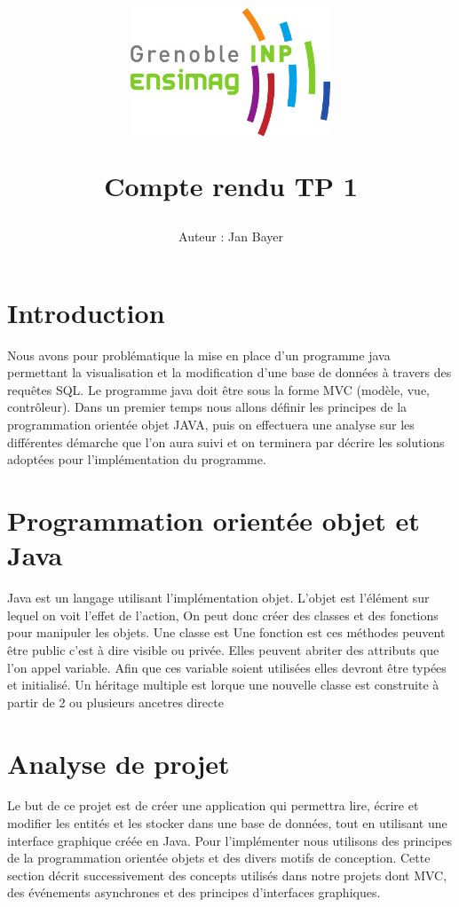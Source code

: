 \documentclass[10pt]{article}
\title{\begin{center}
\includegraphics[width=6cm]{ENSIMAG-eps-converted-to.pdf}
\end{center} \vspace{1cm} Compte rendu TP 1}
\author{Auteur : Jan Bayer }
\begin{document}
\maketitle
\newpage
\section{Introduction}
Nous avons pour problématique la mise en place d’un programme java permettant la visualisation et la modification d’une base de données à travers des requêtes SQL.
Le programme java doit être sous la forme MVC (modèle, vue, contrôleur).
Dans un premier temps nous allons définir les principes de la programmation orientée objet JAVA, puis on effectuera une analyse sur les différentes démarche que l’on aura suivi et on terminera par décrire les solutions adoptées pour l’implémentation du programme.
\section{Programmation orientée objet et Java}
Java est un langage utilisant l’implémentation objet. L’objet est l’élément sur lequel on voit l’effet de l’action, On peut donc créer des classes et des fonctions pour manipuler les objets.
Une classe est
Une fonction est
ces méthodes peuvent être public c’est à dire visible ou privée.
Elles peuvent abriter des attributs que l’on appel variable. Afin que ces variable soient utilisées elles devront être typées et initialisé.
Un héritage multiple est lorque une nouvelle classe est construite à partir de 2 ou plusieurs ancetres directe

\section{Analyse de projet}
Le but de ce projet est de créer une application qui permettra lire, écrire et modifier les entités et les stocker dans une base de données, tout en utilisant une interface graphique créée en Java. Pour l’implémenter nous utilisons des principes de la programmation orientée objets et des divers motifs de conception. Cette section décrit successivement des concepts utilisés dans notre projets dont MVC, des événements asynchrones et des principes d’interfaces graphiques.
\end{document}
